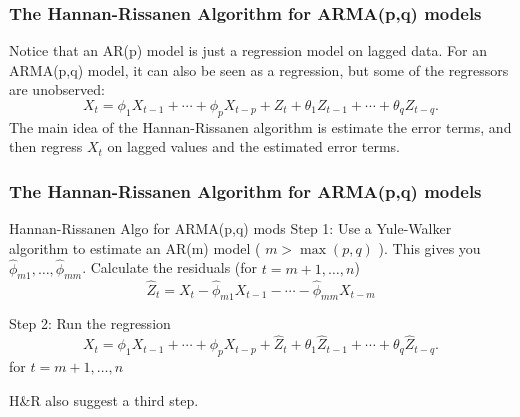 \documentclass{beamer}
\begin{document}

\begin{frame}
\frametitle{The Hannan-Rissanen Algorithm for ARMA(p,q) models}

Notice that an AR(p) model is just a regression model on lagged data. For an ARMA(p,q) model, it can also be seen as a regression, but some of the regressors are unobserved:
\[
X_t = \phi_1X_{t-1} + \cdots + \phi_p X_{t-p} + Z_t + \theta_1 Z_{t-1} + \cdots + \theta_q Z_{t-q}.
\]
The main idea of the Hannan-Rissanen algorithm is estimate the error terms, and then regress $X_t$ on lagged values and the estimated error terms.

\end{frame}


\begin{frame}
\frametitle{The Hannan-Rissanen Algorithm for ARMA(p,q) models}

\begin{block}{Hannan-Rissanen Algo for ARMA(p,q) mods}
Step 1:
Use a Yule-Walker algorithm to estimate an AR(m) model ( $m > \max(p,q)$ ). This gives you $\hat{\phi}_{m1},\ldots, \hat{\phi}_{mm}$. Calculate the residuals (for $t=m+1,\ldots,n$)
\[
\hat{Z}_t = X_t - \hat{\phi}_{m1}X_{t-1} - \cdots - \hat{\phi}_{mm}X_{t-m}
\]

Step 2:
Run the regression
\[
X_t = \phi_1X_{t-1} + \cdots + \phi_p X_{t-p} + \hat{Z}_t + \theta_1 \hat{Z}_{t-1} + \cdots + \theta_q \hat{Z}_{t-q}.
\]
for $t=m+1,\ldots,n$ 

\end{block}
H\&R also suggest a third step.

\end{frame}
\end{document}
